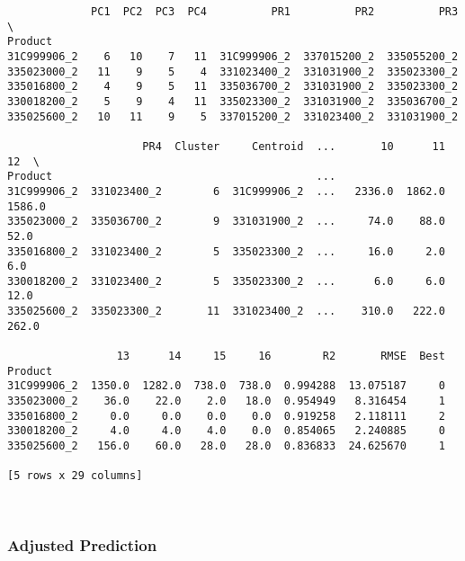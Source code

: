 \documentclass[11pt]{article}
\begin{document}
    
    \begin{verbatim}
             PC1  PC2  PC3  PC4          PR1          PR2          PR3  \
Product                                                                  
31C999906_2    6   10    7   11  31C999906_2  337015200_2  335055200_2   
335023000_2   11    9    5    4  331023400_2  331031900_2  335023300_2   
335016800_2    4    9    5   11  335036700_2  331031900_2  335023300_2   
330018200_2    5    9    4   11  335023300_2  331031900_2  335036700_2   
335025600_2   10   11    9    5  337015200_2  331023400_2  331031900_2   

                     PR4  Cluster     Centroid  ...       10      11      12  \
Product                                         ...                            
31C999906_2  331023400_2        6  31C999906_2  ...   2336.0  1862.0  1586.0   
335023000_2  335036700_2        9  331031900_2  ...     74.0    88.0    52.0   
335016800_2  331023400_2        5  335023300_2  ...     16.0     2.0     6.0   
330018200_2  331023400_2        5  335023300_2  ...      6.0     6.0    12.0   
335025600_2  335023300_2       11  331023400_2  ...    310.0   222.0   262.0   

                 13      14     15     16        R2       RMSE  Best  
Product                                                               
31C999906_2  1350.0  1282.0  738.0  738.0  0.994288  13.075187     0  
335023000_2    36.0    22.0    2.0   18.0  0.954949   8.316454     1  
335016800_2     0.0     0.0    0.0    0.0  0.919258   2.118111     2  
330018200_2     4.0     4.0    4.0    0.0  0.854065   2.240885     0  
335025600_2   156.0    60.0   28.0   28.0  0.836833  24.625670     1  

[5 rows x 29 columns]
    \end{verbatim}

    
    \begin{center}
    \end{center}
    { \hspace*{\fill} \\}
    
    \subsubsection{Adjusted Prediction}\label{adjusted-prediction}
\end{document}
